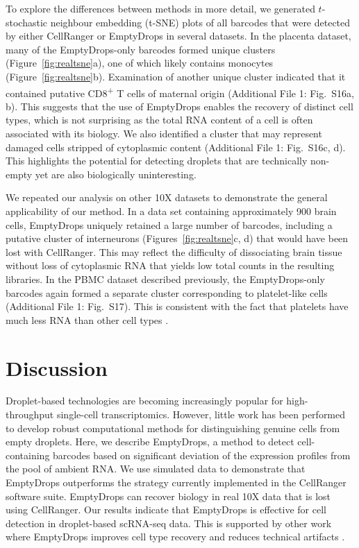 \documentclass{bmcart}
\newcommand{\ADD}[1]{Additional File 1: #1}
\newcommand{\suppfigrealplacenta}{S16}
\newcommand{\suppfigrealpbmc}{S17}
\begin{document}
To explore the differences between methods in more detail, we generated $t$-stochastic neighbour embedding (t-SNE) plots \cite{van2008visualizing} of all barcodes that were detected by either CellRanger or EmptyDrops in several datasets.
In the placenta dataset, many of the EmptyDrops-only barcodes formed unique clusters (Figure~\ref{fig:realtsne}a), one of which likely contains monocytes (Figure~\ref{fig:realtsne}b).
Examination of another unique cluster indicated that it contained putative CD8\textsuperscript{+} T cells of maternal origin (\ADD{Fig.~\suppfigrealplacenta{}a, b}).
This suggests that the use of EmptyDrops enables the recovery of distinct cell types, which is not surprising as the total RNA content of a cell is often associated with its biology.
We also identified a cluster that may represent damaged cells stripped of cytoplasmic content (\ADD{Fig.~\suppfigrealplacenta{}c, d}).
This highlights the potential for detecting droplets that are technically non-empty yet are also biologically uninteresting.

We repeated our analysis on other 10X datasets to demonstrate the general applicability of our method.
In a data set containing approximately 900 brain cells, EmptyDrops uniquely retained a large number of barcodes, including a putative cluster of interneurons (Figures~\ref{fig:realtsne}c, d) that would have been lost with CellRanger.
This may reflect the difficulty of dissociating brain tissue without loss of cytoplasmic RNA \cite{habib2017massively} that yields low total counts in the resulting libraries.
In the PBMC dataset described previously, the EmptyDrops-only barcodes again formed a separate cluster corresponding to platelet-like cells (\ADD{Fig.~\suppfigrealpbmc{}}).
This is consistent with the fact that platelets have much less RNA than other cell types \cite{rowley2012platelet}.

\section*{Discussion}
Droplet-based technologies are becoming increasingly popular for high-throughput single-cell transcriptomics.
However, little work has been performed to develop robust computational methods for distinguishing genuine cells from empty droplets.
Here, we describe EmptyDrops, a method to detect cell-containing barcodes based on significant deviation of the expression profiles from the pool of ambient RNA.
We use simulated data to demonstrate that EmptyDrops outperforms the strategy currently implemented in the CellRanger software suite.
EmptyDrops can recover biology in real 10X data that is lost using CellRanger.
Our results indicate that EmptyDrops is effective for cell detection in droplet-based scRNA-seq data.
This is supported by other work where EmptyDrops improves cell type recovery \cite{ernst2018staged} and reduces technical artifacts \cite{griffiths2018detection}.
\end{document}
